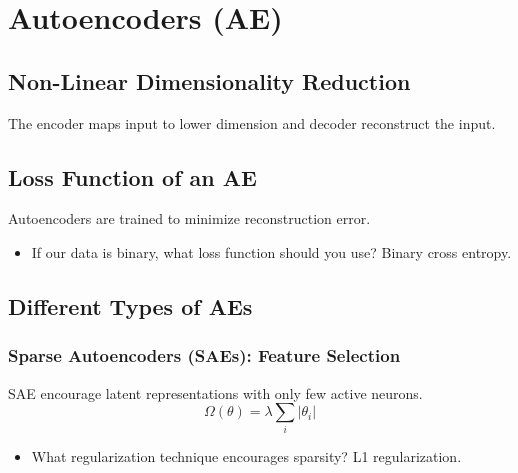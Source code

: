 \documentclass{article}
\begin{document}
\section{Autoencoders (AE)}

\subsection{Non-Linear Dimensionality Reduction}
\begin{definition}
    The encoder maps input to lower dimension and decoder reconstruct the input.
\end{definition}

\subsection{Loss Function of an AE}
\begin{definition}
    Autoencoders are trained to minimize reconstruction error.
\end{definition}

\begin{notes}
    \begin{itemize}
        \item If our data is binary, what loss function should you use? Binary cross entropy.
    \end{itemize}
\end{notes}

\subsection{Different Types of AEs}

\subsubsection{Sparse Autoencoders (SAEs): Feature Selection}
\begin{definition}
    SAE encourage latent representations with only few active neurons. 
    \begin{equation}
        \Omega(\theta) = \lambda \sum_i \left| \theta_i \right|
    \end{equation}
\end{definition}

\begin{notes}
    \begin{itemize}
        \item What regularization technique encourages sparsity? L1 regularization.
    \end{itemize}
\end{notes}
\end{document}
